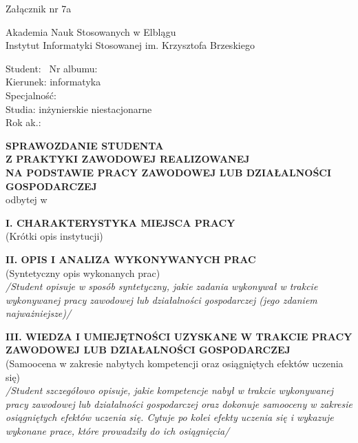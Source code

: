 \documentclass[11pt,a4paper]{article}
\begin{document}
\begin{flushright}
Załącznik nr 7a
\end{flushright}

\vspace{-1em}
\noindent
Akademia Nauk Stosowanych w Elblągu \\
Instytut Informatyki Stosowanej im. Krzysztofa Brzeskiego

\vspace{2em}

\noindent Student: \dotfill\ Nr albumu: \dotfill \\
Kierunek: informatyka \\
Specjalność: \dotfill \\
Studia: inżynierskie niestacjonarne \\
Rok ak.: \dotfill

\vspace{3em}

\begin{center}
\textbf{\large SPRAWOZDANIE STUDENTA} \\[0.5em]
\textbf{\large Z PRAKTYKI ZAWODOWEJ REALIZOWANEJ} \\[0.5em]
\textbf{\large NA PODSTAWIE PRACY ZAWODOWEJ LUB DZIAŁALNOŚCI GOSPODARCZEJ} \\[1em]
odbytej w \dotfill \\
\dotfill
\end{center}

\vspace{3em}

\noindent \textbf{I. CHARAKTERYSTYKA MIEJSCA PRACY} \\
{\small (Krótki opis instytucji)}

\vspace{4em}

\noindent \textbf{II. OPIS I ANALIZA WYKONYWANYCH PRAC} \\
{\small (Syntetyczny opis wykonanych prac)} \\[0.5em]
{\small\textit{/Student opisuje w sposób syntetyczny, jakie zadania wykonywał w trakcie wykonywanej pracy zawodowej lub działalności gospodarczej (jego zdaniem najważniejsze)/}}

\vspace{6em}

\noindent \textbf{III. WIEDZA I UMIEJĘTNOŚCI UZYSKANE W TRAKCIE PRACY ZAWODOWEJ LUB DZIAŁALNOŚCI GOSPODARCZEJ} \\
{\small (Samoocena w zakresie nabytych kompetencji oraz osiągniętych efektów uczenia się)} \\[0.5em]
{\small\textit{/Student szczegółowo opisuje, jakie kompetencje nabył w trakcie wykonywanej pracy zawodowej lub działalności gospodarczej oraz dokonuje samooceny w zakresie osiągniętych efektów uczenia się. Cytuje po kolei efekty uczenia się i wykazuje wykonane prace, które prowadziły do ich osiągnięcia/}}
\end{document}
